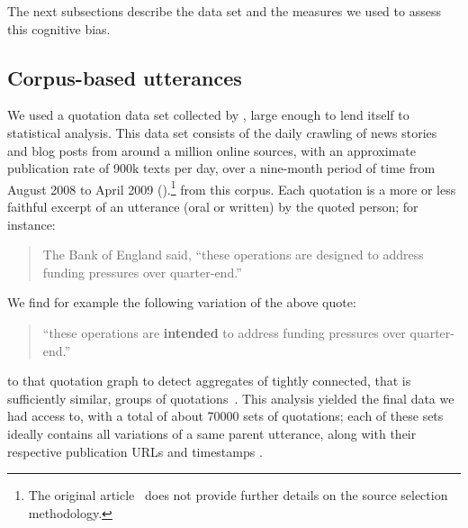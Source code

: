 The next subsections describe the data set and the measures we used to assess this cognitive bias.

\subsection{Corpus-based utterances}

We used a quotation data set collected by \citet{leskovec_meme-tracking_2009}, large enough to lend itself to statistical analysis.
This data set consists of the daily crawling of news stories and blog posts from around a million online sources, with an approximate publication rate of 900k texts per day, over a nine-month period of time from August 2008 to April 2009 (\citealp{leskovec_memetracker:_2009}).\footnote{
The original article~\citep{leskovec_meme-tracking_2009} does not provide further details on the source selection methodology.
}
 from this corpus.
Each quotation is a more or less faithful excerpt of an utterance (oral or written) by the quoted person; for instance:
\begin{quote}
The Bank of England said, ``these operations are designed to address funding pressures over quarter-end.''
\end{quote}

We find for example the following variation of the above quote:
\begin{quote}
``these operations are \textbf{intended} to address funding pressures over quarter-end.''
\end{quote}
 to that quotation graph to detect aggregates of tightly connected, that is
sufficiently similar, groups of quotations~\citep[see again][for more details]{leskovec_meme-tracking_2009}.
This analysis yielded the final data we had access to, with a total of about \num{70000} sets of quotations; each of these sets ideally contains all variations of a same parent utterance, along with their respective publication URLs and timestamps .

